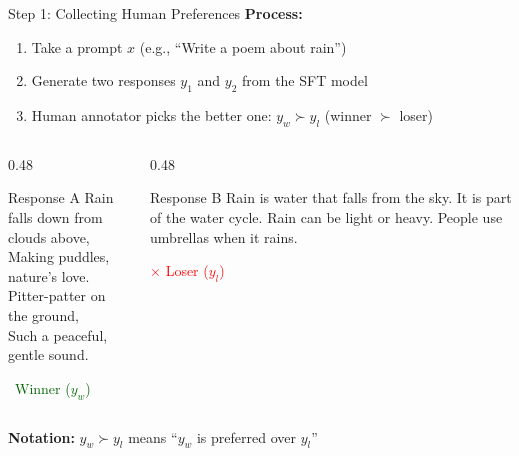 \documentclass[aspectratio=169,11pt]{beamer}
\begin{document}
\begin{frame}{Step 1: Collecting Human Preferences}
\textbf{Process:}
\begin{enumerate}
    \item Take a prompt $x$ (e.g., ``Write a poem about rain'')
    \item Generate two responses $y_1$ and $y_2$ from the SFT model
    \item Human annotator picks the better one: $y_w \succ y_l$ (winner $\succ$ loser)
\end{enumerate}

\vspace{0.3cm}
\begin{columns}[T]
\begin{column}{0.48\textwidth}
\begin{block}{Response A}
{\small Rain falls down from clouds above,\\
Making puddles, nature's love.\\
Pitter-patter on the ground,\\
Such a peaceful, gentle sound.}

\vspace{0.1cm}
\centering\textcolor{darkgreen}{\checkmark\ Winner ($y_w$)}
\end{block}
\end{column}
\begin{column}{0.48\textwidth}
\begin{block}{Response B}
{\small Rain is water that falls from the sky. It is part of the water cycle. Rain can be light or heavy. People use umbrellas when it rains.}

\vspace{0.1cm}
\centering\textcolor{red}{$\times$ Loser ($y_l$)}
\end{block}
\end{column}
\end{columns}

\vspace{0.3cm}
\textbf{Notation:} $y_w \succ y_l$ means ``$y_w$ is preferred over $y_l$''
\end{frame}
\end{document}

